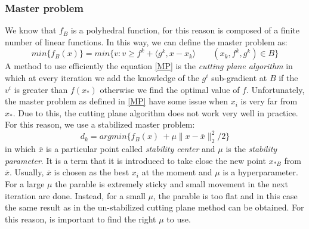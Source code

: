 \subsubsection{Master problem}
We know that $f_B$ is a polyhedral function, for this reason is composed of a finite number of linear functions.
In this way, we can define the master problem as:
\begin{equation}
\label{MP}
min\{f_B(x)\} = min\{v : v \geq f^k + \langle g^k, x-x_k \rangle \qquad (x_k, f^k, g^k) \in B \}
\end{equation} 
A method to use efficiently the equation \ref{MP} is the \textit{cutting plane algorithm} in which at every iteration we add the knowledge of the $g^i$ sub-gradient at $B$ if the $v^i$ is greater than $f(x_*)$ otherwise we find the optimal value of $f$.  
Unfortunately, the master problem as defined in \ref{MP} have some issue when $x_i$ is very far from $x_*$. Due to this, the cutting plane algorithm does not work very well in practice.
For this reason, we use a stabilized master problem: 
\begin{equation}
\label{SMP}
 d_{k}=argmin\{f_B(x)\ + \mu \parallel x- \overline{x}\parallel_{2}^2/2 \}
\end{equation} 
in which $\overline{x}$ is a particular point called \textit{stability center} and $\mu$ is the \textit{stability parameter}.  It is a term that it is introduced to take close the new point $x_{*B}$ from $\overline{x}$.
Usually, $\overline{x}$ is chosen as the best $x_i$ at the moment and $\mu$ is a hyperparameter.
For a large $\mu$ the parable is extremely sticky and small movement in the next iteration are done.
Instead,  for a small $\mu$, the parable is too flat and in this case the same result as in the un-stabilized cutting plane method can be obtained. For this reason, is important to find the right $\mu$ to use.
